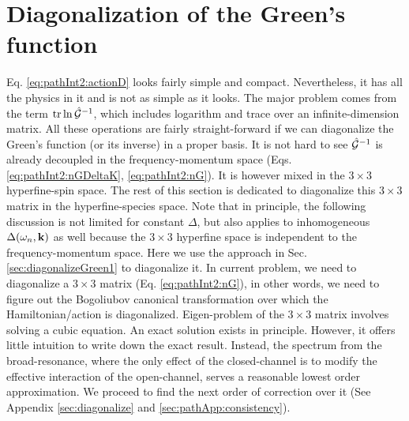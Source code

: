 \section{Diagonalization of the Green's function\label{sec:diagonalGreen}}
Eq. \eqref{eq:pathInt2:actionD} looks fairly simple and compact.  Nevertheless, it has all the physics in it and is not as simple as it looks.  The major problem comes from the term $\text{tr}\ln\hat{\mathcal{G}}^{-1}$, which includes  logarithm and trace over an infinite-dimension matrix.   All these operations are fairly straight-forward if we can diagonalize the  Green's function (or its inverse) in a proper basis.      It is not hard to see $\hat{\mathcal{G}}^{-1}$ is already decoupled in the frequency-momentum space (Eqs.  \ref{eq:pathInt2:nGDeltaK}, \ref{eq:pathInt2:nG}).  It is however mixed in the $3\times3$ hyperfine-spin space.  The rest of this section is dedicated to diagonalize this $3\times3$ matrix in the hyperfine-species space.  Note that in principle, the following discussion is not limited for constant $\Delta$, but also applies to inhomogeneous $\Delta(\omega_{n},\mathbf{k})$ as well because the $3\times3$ hyperfine space is independent to the frequency-momentum space.   Here we use the approach in Sec. \ref{sec:diagonalizeGreen1} to diagonalize it.   
In current problem, we need to diagonalize a $3\times3$ matrix (Eq. \ref{eq:pathInt2:nG}), in other words, we need to figure out the Bogoliubov canonical transformation over which the Hamiltonian/action is diagonalized.   Eigen-problem of the $3\times3$ matrix involves solving a cubic equation. An exact solution exists in principle.  However,  it offers little intuition to write down the exact result. Instead,  the spectrum from the broad-resonance, where the only effect of the closed-channel is to modify the effective interaction of the open-channel, serves a reasonable lowest order approximation. We proceed to find the next order of correction over it (See Appendix \ref{sec:diagonalize} and \ref{sec:pathApp:consistency}). 


